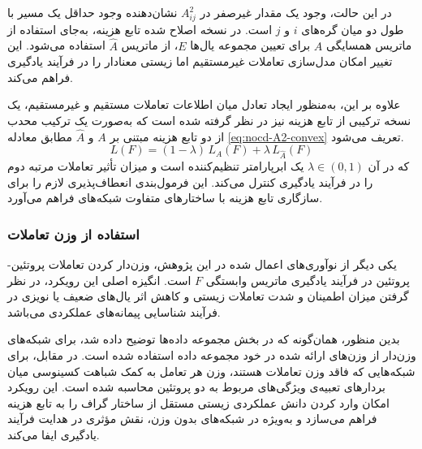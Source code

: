 در این حالت، وجود یک مقدار غیرصفر در $A^2_{ij}$ نشان‌دهنده وجود حداقل یک مسیر با طول دو میان گره‌های $i$ و $j$ است. در نسخه اصلاح‌ شده تابع هزینه، به‌جای استفاده از ماتریس همسایگی $A$ برای تعیین مجموعه یال‌ها $E$، از ماتریس $\hat{A}$ استفاده می‌شود. این تغییر امکان مدل‌سازی تعاملات غیرمستقیم اما زیستی معنادار را در فرآیند یادگیری فراهم می‌کند.

علاوه بر این، به‌منظور ایجاد تعادل میان اطلاعات تعاملات مستقیم و غیرمستقیم، یک نسخه ترکیبی از تابع هزینه نیز در نظر گرفته شده است که به‌صورت یک ترکیب محدب از دو تابع هزینه مبتنی بر $A$ و $\hat{A}$ مطابق معادله \ref{eq:nocd-A2-convex} تعریف می‌شود.
\begin{equation}
	L(F) = (1-\lambda)\, L_{A}(F) + \lambda\, L_{\hat{A}}(F)
	\label{eq:nocd-A2-convex}
\end{equation}
که در آن $\lambda \in (0,1)$ یک ابرپارامتر تنظیم‌کننده است و میزان تأثیر تعاملات مرتبه دوم را در فرآیند یادگیری کنترل می‌کند. این فرمول‌بندی انعطاف‌پذیری لازم را برای سازگاری تابع هزینه با ساختارهای متفاوت شبکه‌های  فراهم می‌آورد.

\subsubsection{استفاده از وزن تعاملات}
یکی دیگر از نوآوری‌های اعمال‌ شده در این پژوهش، وزن‌دار کردن تعاملات پروتئین-پروتئین در فرآیند یادگیری ماتریس وابستگی $F$ است. انگیزه اصلی این رویکرد، در نظر گرفتن میزان اطمینان و شدت تعاملات زیستی و کاهش اثر یال‌های ضعیف یا نویزی در فرآیند شناسایی پیمانه‌های عملکردی می‌باشد. 

بدین منظور، همان‌گونه که در بخش مجموعه‌ داده‌ها توضیح داده شد، برای شبکه‌های  وزن‌دار از وزن‌های ارائه ‌شده در خود مجموعه‌ داده استفاده شده است. در مقابل، برای شبکه‌هایی که فاقد وزن تعاملات هستند، وزن هر تعامل به کمک شباهت کسینوسی میان بردارهای تعبیه‌ی ویژگی‌های  مربوط به دو پروتئین محاسبه شده است. این رویکرد امکان وارد کردن دانش عملکردی زیستی مستقل از ساختار گراف را به تابع هزینه فراهم می‌سازد و به‌ویژه در شبکه‌های بدون وزن، نقش مؤثری در هدایت فرآیند یادگیری ایفا می‌کند.

